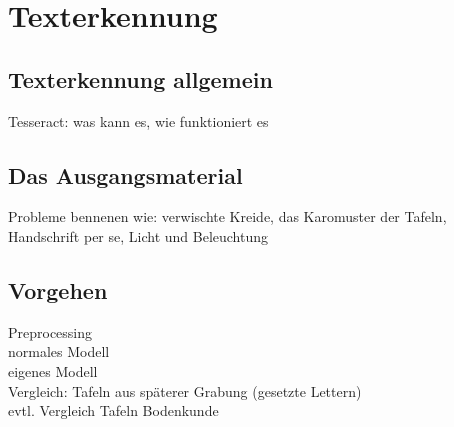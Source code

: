 \section{Texterkennung}
\subsection{Texterkennung allgemein}
Tesseract: was kann es, wie funktioniert es
\subsection{Das Ausgangsmaterial}
Probleme bennenen wie: verwischte Kreide, das Karomuster der Tafeln, Handschrift per se, Licht und Beleuchtung
\subsection{Vorgehen}
Preprocessing\\
normales Modell\\
eigenes Modell\\
Vergleich: Tafeln aus späterer Grabung (gesetzte Lettern)\\
evtl. Vergleich Tafeln Bodenkunde